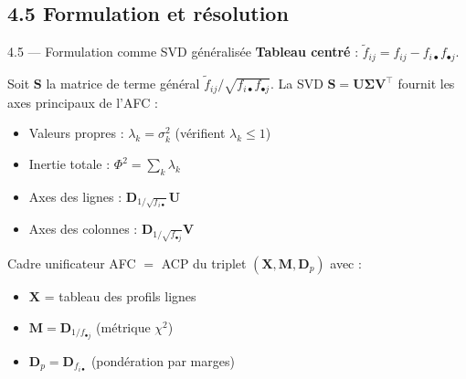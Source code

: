 \subsection{4.5 Formulation et résolution}
\begin{frame}{4.5 — Formulation comme SVD généralisée}
\textbf{Tableau centré} : $\widetilde{f}_{ij} = f_{ij} - f_{i\bullet} f_{\bullet j}$.

\begin{theorem}[Diagonalisation]
Soit $\mathbf{S}$ la matrice de terme général $\widetilde{f}_{ij}/\sqrt{f_{i\bullet} f_{\bullet j}}$.
La SVD $\mathbf{S} = \mathbf{U}\mathbf{\Sigma}\mathbf{V}^\top$ fournit les axes principaux
de l'AFC :
\begin{itemize}
  \item Valeurs propres : $\lambda_k = \sigma_k^2$ (vérifient $\lambda_k \leq 1$)
  \item Inertie totale : $\Phi^2 = \sum_k \lambda_k$
  \item Axes des lignes : $\mathbf{D}_{1/\sqrt{f_{i\bullet}}} \mathbf{U}$
  \item Axes des colonnes : $\mathbf{D}_{1/\sqrt{f_{\bullet j}}} \mathbf{V}$
\end{itemize}
\end{theorem}

\begin{block}{Cadre unificateur}
\small AFC $=$ ACP du triplet $(\mathbf{X}, \mathbf{M}, \mathbf{D}_p)$ avec :
\begin{itemize}\small
  \item $\mathbf{X}$ = tableau des profils lignes
  \item $\mathbf{M} = \mathbf{D}_{1/f_{\bullet j}}$ (métrique $\chi^2$)
  \item $\mathbf{D}_p = \mathbf{D}_{f_{i\bullet}}$ (pondération par marges)
\end{itemize}
\end{block}
\end{frame}

